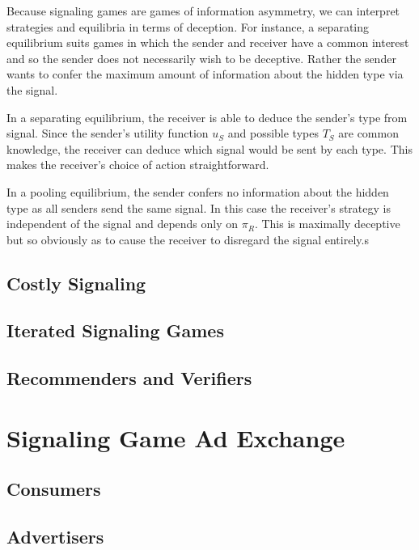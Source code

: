 \documentclass{article}
\begin{document}
Because signaling games are games of information asymmetry, we can interpret strategies and equilibria in terms of deception. For instance, a separating equilibrium suits games in which the sender and receiver have a common interest and so the sender does not necessarily wish to be deceptive. Rather the sender wants to confer the maximum amount of information about the hidden type via the signal.

In a separating equilibrium, the receiver is able to deduce the sender's type from signal. Since the sender's utility function $u_{S}$ and possible types $T_S$ are common knowledge, the receiver can deduce which signal would be sent by each type. This makes the receiver's choice of action straightforward.

In a pooling equilibrium, the sender confers no information about the hidden type as all senders send the same signal. In this case the receiver's strategy is independent of the signal and depends only on $\pi_{ R}$. This is maximally deceptive but so obviously as to cause the receiver to disregard the signal entirely.s

\subsection{Costly Signaling}



\subsection{Iterated Signaling Games}

\subsection{Recommenders and Verifiers}

\newpage

\section{Signaling Game Ad Exchange}

\subsection{Consumers}

\subsection{Advertisers}
\end{document}

